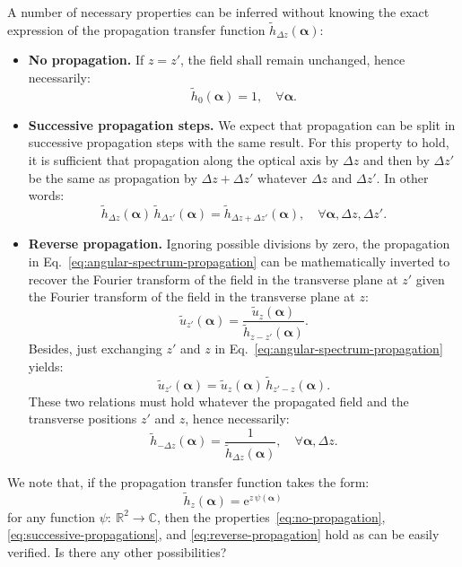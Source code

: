\documentclass[a4paper]{article}
\newcommand{\oops}[1]{{\color{purple}#1}}
\newcommand{\V}[1]{\boldsymbol{#1}}
\newcommand*{\from}{{:}\:}
\newcommand*{\mathe}{\mathrm{e}}
\newcommand*{\FT}[1]{\widetilde{#1}}
\begin{document}
A number of necessary properties can be inferred without knowing the exact
expression of the propagation transfer function $\FT{h}_{Δz}(\V{α})$:
\begin{itemize}
\item \textbf{No propagation.} If $z = z'$, the field shall remain unchanged,
      hence necessarily:
      \begin{equation}
        \label{eq:no-propagation}
        \FT{h}_{0}(\V{α}) = 1,\quad ∀\V{α}.
      \end{equation}

\item \textbf{Successive propagation steps.} We expect that propagation can be
      split in successive propagation steps with the same result. For this
      property to hold, it is sufficient that propagation along the optical
      axis by $Δz$ and then by $Δz'$ be the same as propagation by
      $Δz + Δz'$ whatever $Δz$ and $Δz'$. In other words:
      \begin{equation}
        \label{eq:successive-propagations}
        \FT{h}_{Δz}(\V{α})\,
        \FT{h}_{Δz'}(\V{α}) =
        \FT{h}_{Δz + Δz'}(\V{α}),
        \quad ∀\V{α}, Δz, Δz'.
      \end{equation}

\item \textbf{Reverse propagation.} Ignoring possible divisions by zero, the
      propagation in Eq.~\eqref{eq:angular-spectrum-propagation} can be
      mathematically inverted to recover the Fourier transform of the field in
      the transverse plane at $z'$ given the Fourier transform of the field
      in the transverse plane at $z$:
      \begin{displaymath}
        \FT{u}_{z'}(\V{α})
        = \frac{\FT{u}_{z}(\V{α})}{\FT{h}_{z - z'}(\V{α})}.
      \end{displaymath}
      Besides, just exchanging $z'$ and $z$ in
      Eq.~\eqref{eq:angular-spectrum-propagation} yields:
      \begin{displaymath}
        \FT{u}_{z'}(\V{α}) =
        \FT{u}_{z}(\V{α})\,\FT{h}_{z' - z}(\V{α}).
      \end{displaymath}
      These two relations must hold whatever the propagated field and the
      transverse positions $z'$ and $z$, hence necessarily:
      \begin{equation}
        \label{eq:reverse-propagation}
        \FT{h}_{-Δz}(\V{α})
        = \frac{1}{\FT{h}_{Δz}(\V{α})},\quad ∀\V{α},Δz.
      \end{equation}
\end{itemize}
We note that, if the propagation transfer function takes the form:
\begin{equation}
  \label{eq:exponential-form}
  \FT{h}_{z}(\V{α}) = \mathe^{z\,ψ(\V{α})}
\end{equation}
for any function $ψ \from ℝ^{2}\to ℂ$, then the
properties~\eqref{eq:no-propagation}, \eqref{eq:successive-propagations}, and
\eqref{eq:reverse-propagation} hold as can be easily verified. \oops{Is there
  any other possibilities?}
\end{document}
